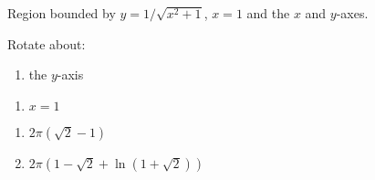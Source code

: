 {Region bounded by $y=1/\sqrt{x^2+1}$, $x=1$ and the $x$ and $y$-axes.

Rotate about:

\noindent%
\begin{minipage}[t]{.5\linewidth}
\begin{enumerate}
\item		the $y$-axis
\end{enumerate}
\end{minipage}
\begin{minipage}[t]{.5\linewidth}
\begin{enumerate}\addtocounter{enumii}{1}
\item		$x=1$
\end{enumerate}
\end{minipage}
}
{\begin{enumerate}
\item $2\pi\left(\sqrt{2}-1\right)$
\item $2\pi\left(1-\sqrt{2}+\ln\left(1+\sqrt{2}\right)\right)$
\end{enumerate}
}
